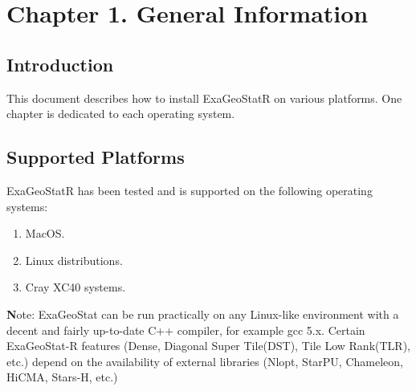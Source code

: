 \documentclass[
10pt, %
a4paper, %
oneside, %
headinclude,footinclude, %
BCOR5mm, %
]{scrartcl}
\begin{document}

\section{Chapter 1. General Information}

\subsection{Introduction}
This document describes how to install ExaGeoStatR on various platforms. One chapter
is dedicated to each operating system.

\subsection{Supported Platforms}
ExaGeoStatR has been tested and is supported on the following operating systems:

\begin{enumerate}
\item MacOS.
\item Linux distributions.
\item Cray XC40 systems.
\end{enumerate}

\begin{shaded}
{\textbf Note:} ExaGeoStat can be run practically on any Linux-like environment with a decent and fairly
up-to-date C++ compiler, for example gcc 5.x. Certain ExaGeoStat-R features (Dense, Diagonal Super Tile(DST), Tile Low Rank(TLR), etc.) depend on the availability of external libraries
(Nlopt, StarPU, Chameleon, HiCMA, Stars-H, etc.)
\end{shaded}
\end{document}
